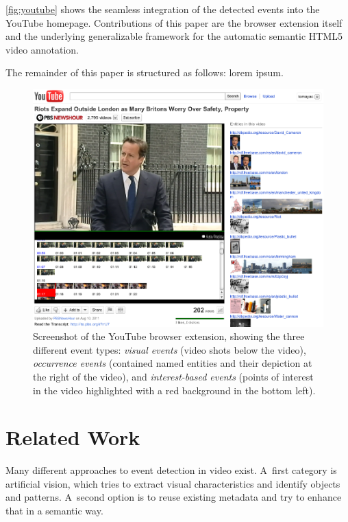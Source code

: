 \documentclass[runningheads,a4paper]{llncs}
\begin{document}
\autoref{fig:youtube} shows the seamless integration of the detected events into the YouTube homepage. Contributions of this paper are the browser extension itself and the underlying generalizable framework for the automatic semantic HTML5 video annotation.

The remainder of this paper is structured as follows: lorem ipsum.

\begin{figure}[htb!]
\begin{center}
   \includegraphics[width=0.8\linewidth]{./resources/youtube}
\end{center}
   \caption{Screenshot of the YouTube browser extension, showing the three different event types: \emph{visual events} (video shots below the video), \emph{occurrence events} (contained named entities and their depiction at the right of the video), and \emph{interest-based events} (points of interest in the video highlighted with a red background in the bottom left).}
\label{fig:youtube}
\end{figure}


\section{Related Work} \label{sec:related-work}
Many different approaches to event detection in video exist.
A~first category is artificial vision, which tries to extract visual characteristics and identify objects and patterns.
A~second option is to reuse existing metadata and try to enhance that in a semantic way.
\end{document}

